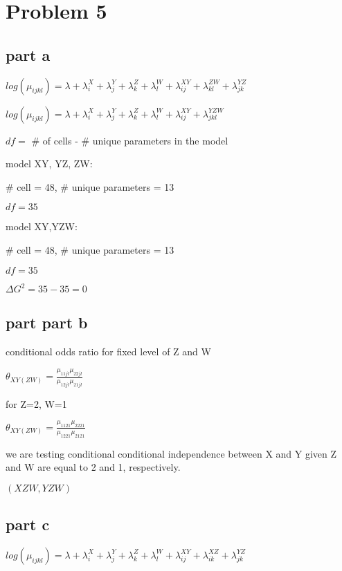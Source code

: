 \documentclass[]{article}
\begin{document}
\section{Problem 5}\label{problem-5}

\subsection{part a}\label{part-a-3}

\(log(\mu_{ijkl}) = \lambda + \lambda_{i}^X + \lambda_{j}^{Y} + \lambda_{k}^{Z} + \lambda_{l}^{W} + \lambda_{ij}^{XY} + \lambda_{kl}^{ZW} + \lambda_{jk}^{YZ}\)

\(log(\mu_{ijkl}) = \lambda + \lambda_{i}^X + \lambda_{j}^{Y} + \lambda_{k}^{Z} + \lambda_{l}^{W} + \lambda_{ij}^{XY} + \lambda_{jkl}^{YZW}\)

\(df=\) \# of cells - \# unique parameters in the model

model XY, YZ, ZW:

\# cell = 48, \# unique parameters = 13

\(df= 35\)

model XY,YZW:

\# cell = 48, \# unique parameters = 13

\(df= 35\)

\(\Delta G^2= 35 -35 = 0\)

\subsection{part part b}\label{part-part-b}

conditional odds ratio for fixed level of Z and W

\(\theta_{XY(ZW)} = \frac{\mu_{11jl} \mu_{22jl}}{\mu_{12jl}{\mu_{21jl}}}\)

for Z=2, W=1

\(\theta_{XY(ZW)} = \frac{\mu_{1121} \mu_{2221}}{\mu_{1221}{\mu_{2121}}}\)

we are testing conditional conditional independence between X and Y
given Z and W are equal to 2 and 1, respectively.

\((XZW, YZW)\)

\subsection{part c}\label{part-c-3}

\(log(\mu_{ijkl}) = \lambda + \lambda_{i}^X + \lambda_{j}^{Y} + \lambda_{k}^{Z} + \lambda_{l}^{W} + \lambda_{ij}^{XY} + \lambda_{ik}^{XZ} + \lambda_{jk}^{YZ}\)
\end{document}
